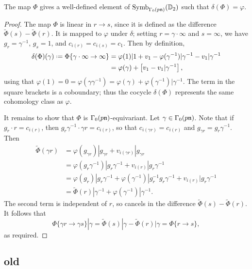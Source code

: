\documentclass[a4paper,10pt]{article}
\numberwithin{equation}{section}
\begin{document}
	
	\begin{proposition}
		The map $\Phi$ gives a well-defined element of $\mathrm{Symb}_{\Gamma_0(p\mathfrak{n})}(\mathbb{D}_2)$ such that $\delta(\Phi) = \varphi$.
	\end{proposition}
	\begin{proof}
		The map $\Phi$ is linear in $r \to s$, since it is defined as the difference $\widetilde{\Phi}(s) - \widetilde{\Phi}(r)$. It is mapped to $\varphi$ under $\delta$; setting $r = \gamma\cdot\infty$ and $s = \infty$, we have $g_r = \gamma^{-1}$, $g_s = 1$, and $c_{i(r)} = c_{i(s)} = c_1$. Then by definition,
		\begin{align*}
			\delta(\Phi)(\gamma) \defeq \Phi\{\gamma\cdot\infty \to \infty\} &= \varphi(1)|1 + v_1 - \varphi(\gamma^{-1})|\gamma^{-1} - v_1|\gamma^{-1}\\
									&= \varphi(\gamma) + \left[v_1 - v_1|\gamma^{-1}\right],
		\end{align*}
		using that $\varphi(1) = 0 = \varphi(\gamma\gamma^{-1}) = \varphi(\gamma) + \varphi(\gamma^{-1})|\gamma^{-1}$. The term in the square brackets is a coboundary; thus the cocycle $\delta(\Phi)$ represents the same cohomology class as $\varphi$.
		
		It remains to show that $\Phi$ is $\Gamma_0(p\mathfrak{n})$-equivariant. Let $\gamma \in \Gamma_0(p\mathfrak{n})$. Note that if $g_r \cdot r = c_{i(r)}$, then $g_r\gamma^{-1} \cdot \gamma r = c_{i(r)}$, so that $c_{i(\gamma r)} = c_{i(r)}$ and $g_{\gamma r} = g_r\gamma^{-1}$. Then
		\begin{align*}
			\widetilde{\Phi}(\gamma r) &= \varphi(g_{\gamma r})|g_{\gamma r} + v_{i(\gamma r)}|g_{\gamma r}\\
					 &= \varphi(g_r \gamma^{-1})|g_r\gamma^{-1} + v_{i(r)}|g_r\gamma^{-1}\\
						&= \varphi(g_r)|g_r\gamma^{-1} + \varphi(\gamma^{-1})|g_r^{-1}g_r\gamma^{-1} + v_{i(r)}|g_r\gamma^{-1}\\
						&= \widetilde{\Phi}(r)|\gamma^{-1} + \varphi(\gamma^{-1})|\gamma^{-1}.
		\end{align*}
		The second term is independent of $r$, so cancels in the difference $\widetilde{\Phi}(s) - \widetilde{\Phi}(r)$. It follows that
		\[
			\Phi\{\gamma r \to \gamma s\}|\gamma = \widetilde{\Phi}(s)|\gamma - \widetilde{\Phi}(r)|\gamma = \Phi\{r\to s\},
		\]
		as required.
	\end{proof}





\subsection{old}
\end{document}
